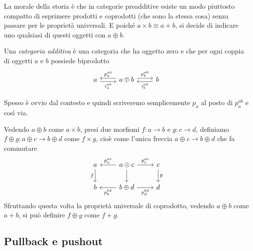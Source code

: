 La morale della storia è che in categorie preadditive esiste un modo
piuttosto compatto di esprimere prodotti e coprodotti (che sono la
stessa cosa) senza passare per le proprietà universali. E poiché
\(a \times b \cong a + b\), si decide di indicare uno qualsiasi di
questi oggetti con \(a \oplus b\).

\begin{definition}
  Una {\em categoria additiva} è una categoria che ha oggetto zero e che
  per ogni coppia di oggetti \(a\) e \(b\) possiede biprodotto
  \[
    \begin{tikzcd}
      a \ar["{i_a^{ab}}", r, shift right, swap] & a \oplus b
      \ar["{p_a^{ab}}", l, shift right, swap] \ar["{p_b^{ab}}", r, shift
      left] & b \ar["{i_b^{ab}}", l, shift left]
    \end{tikzcd}
  \]
\end{definition}

Spesso è ovvio dal contesto e quindi scriveremo semplicemente \(p_a\) al
posto di \(p_a^{ab}\) e così via.

Vedendo \(a \oplus b\) come \(a \times b\), presi due morfismi
\(f : a \to b\) e \(g : c \to d\), definiamo
\(f \oplus g : a \oplus c \to b \oplus d\) come \(f \times g\), cioè
come l'unica freccia \(a \oplus c \to b \oplus d\) che fa commutare
\[
  \begin{tikzcd}
    a \ar["{f}", d, swap] & a \oplus c \ar["{p_a^{ac}}", l, swap]
    \ar["{}", d] \ar["{p_c^{ac}}", r] & c \ar["{g}", d] \\
    b & b \oplus d \ar["{p_b^{bd}}", l] \ar["{p_d^{bd}}", r, swap] & d
  \end{tikzcd}
\]
Sfruttando questa volta la proprietà universale di coprodotto, vedendo
\(a \oplus b\) come \(a + b\), si può definire \(f \oplus g\) come
\(f + g\).


\subsection{Pullback e pushout}

